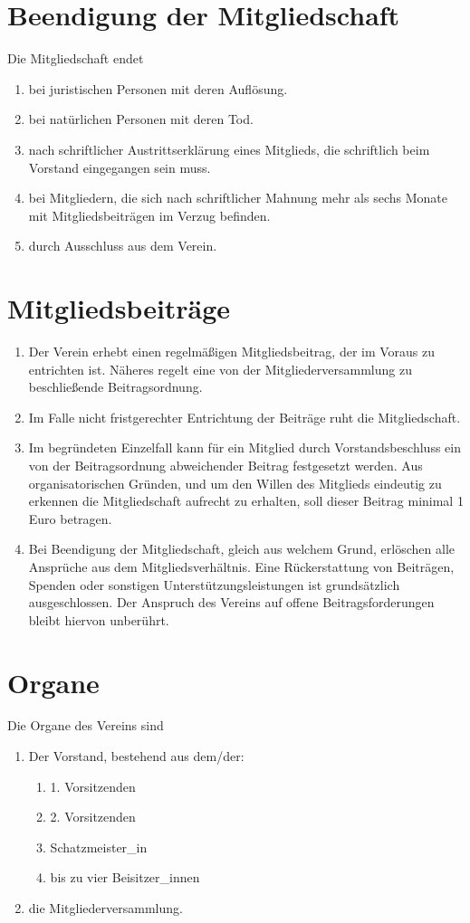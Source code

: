 \documentclass[a4paper, 12pt]{scrartcl}
\begin{document}
\section{Beendigung der Mitgliedschaft}
Die Mitgliedschaft endet
\begin{enumerate}
	\item bei juristischen Personen mit deren Auflösung.
	\item bei natürlichen Personen mit deren Tod.
	\item nach schriftlicher Austrittserklärung eines Mitglieds, die schriftlich beim Vorstand eingegangen sein muss.
	\item bei Mitgliedern, die sich nach schriftlicher Mahnung mehr als sechs Monate mit Mitgliedsbeiträgen im Verzug befinden.
	\item durch Ausschluss aus dem Verein.
\end{enumerate}

\section{Mitgliedsbeiträge}
\label{mitgliedsbeitraege}
\begin{enumerate}
	\item Der Verein erhebt einen regelmäßigen Mitgliedsbeitrag, der im Voraus zu entrichten ist. Näheres regelt eine von der Mitgliederversammlung zu beschließende Beitragsordnung.
	\item Im Falle nicht fristgerechter Entrichtung der Beiträge ruht die Mitgliedschaft.
	\item \label{mitgliedsbeitraege-mindestbeitrag} Im begründeten Einzelfall kann für ein Mitglied durch Vorstandsbeschluss ein von der Beitragsordnung abweichender Beitrag festgesetzt werden. Aus organisatorischen Gründen, und um den Willen des Mitglieds eindeutig zu erkennen die Mitgliedschaft aufrecht zu erhalten, soll dieser Beitrag minimal 1 Euro betragen.
	\item Bei Beendigung der Mitgliedschaft, gleich aus welchem Grund, erlöschen alle Ansprüche aus dem Mitgliedsverhältnis. Eine Rückerstattung von Beiträgen, Spenden oder sonstigen Unterstützungsleistungen ist grundsätzlich ausgeschlossen. Der Anspruch des Vereins auf offene Beitragsforderungen bleibt hiervon unberührt.
\end{enumerate}

\section{Organe}
Die Organe des Vereins sind
\begin{enumerate}
	\item Der Vorstand, bestehend aus dem/der:
	\begin{enumerate}
		\item 1. Vorsitzenden
		\item 2. Vorsitzenden
		\item Schatzmeister\_in
		\item bis zu vier Beisitzer\_innen
	\end{enumerate}
	\item die Mitgliederversammlung.
\end{enumerate}
\end{document}
